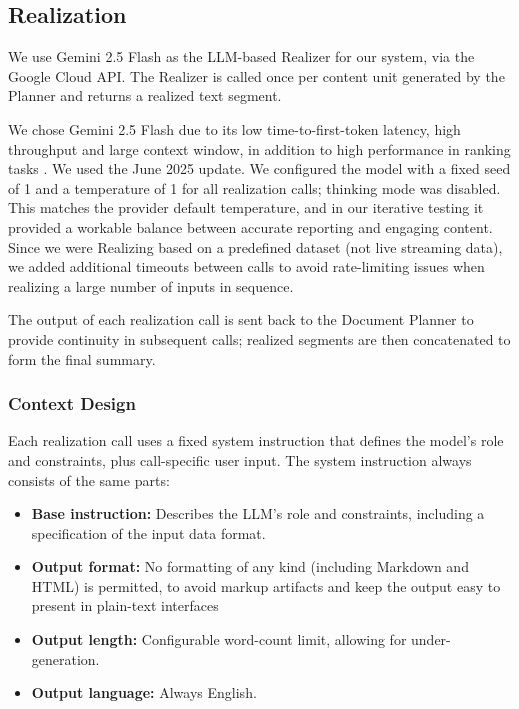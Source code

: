 \subsection{Realization}
We use Gemini 2.5 Flash as the LLM-based Realizer for our system, via the Google Cloud API. The Realizer is called once per content unit generated by the Planner and returns a realized text segment.

We chose Gemini 2.5 Flash due to its low time-to-first-token latency, high throughput and large context window, in addition to high performance in ranking tasks \cite{gemini2025}. We used the June 2025 update. We configured the model with a fixed seed of 1 and a temperature of 1 for all realization calls; thinking mode was disabled. This matches the provider default temperature, and in our iterative testing it provided a workable balance between accurate reporting and engaging content. Since we were Realizing based on a predefined dataset (not live streaming data), we added additional timeouts between calls to avoid rate-limiting issues when realizing a large number of inputs in sequence.

The output of each realization call is sent back to the Document Planner to provide continuity in subsequent calls; realized segments are then concatenated to form the final summary.

\subsubsection{Context Design}
Each realization call uses a fixed system instruction that defines the model's role and constraints, plus call-specific user input. The system instruction always consists of the same parts:

\begin{itemize}
  \item \textbf{Base instruction:} Describes the LLM's role and constraints, including a specification of the input data format.
  \item \textbf{Output format:} No formatting of any kind (including Markdown and HTML) is permitted, to avoid markup artifacts and keep the output easy to present in plain-text interfaces
  \item \textbf{Output length:} Configurable word-count limit, allowing for under-generation.
  \item \textbf{Output language:} Always English.
\end{itemize}

